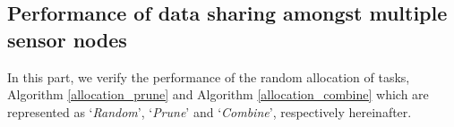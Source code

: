 \documentclass[prodmode,acmtosn]{acmsmall}
\begin{document}
\subsection{Performance of data sharing amongst multiple sensor nodes}
\label{section_performance_wsn}
In this part, we verify the performance of the random allocation of tasks, Algorithm \ref{allocation_prune}
and Algorithm \ref{allocation_combine} which are represented as `\textit{Random}', `\textit{Prune}' and `\textit{Combine}', respectively  hereinafter.
\begin{figure}[!t]
\centering {}

\end{figure}
\end{document}
